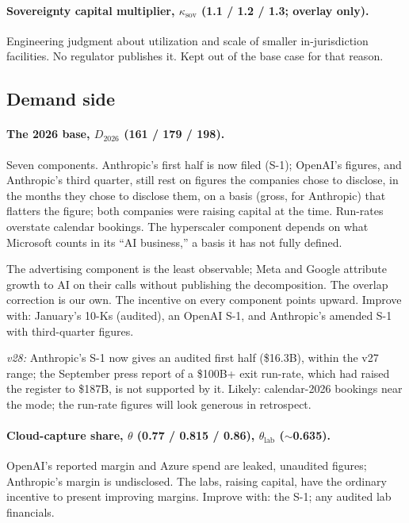 \documentclass[11pt,letterpaper]{article}
\begin{document}
\paragraph{Sovereignty capital multiplier, $\kappa_{\text{sov}}$ (1.1 / 1.2 / 1.3; overlay only).} Engineering judgment about utilization and scale of smaller in-jurisdiction facilities. No regulator publishes it. Kept out of the base case for that reason.

\subsection*{Demand side}

\paragraph{The 2026 base, $D_{2026}$ (161 / 179 / 198).} Seven components. Anthropic's first half is now filed (S-1); OpenAI's figures, and Anthropic's third quarter, still rest on figures the companies chose to disclose, in the months they chose to disclose them, on a basis (gross, for Anthropic) that flatters the figure; both companies were raising capital at the time. Run-rates overstate calendar bookings. The hyperscaler component depends on what Microsoft counts in its ``AI business,'' a basis it has not fully defined.

The advertising component is the least observable; Meta and Google attribute growth to AI on their calls without publishing the decomposition. The overlap correction is our own. The incentive on every component points upward. Improve with: January's 10-Ks (audited), an OpenAI S-1, and Anthropic's amended S-1 with third-quarter figures.

\emph{v28:} Anthropic's S-1 now gives an audited first half (\$16.3B), within the v27 range; the September press report of a \$100B+ exit run-rate, which had raised the register to \$187B, is not supported by it. Likely: calendar-2026 bookings near the mode; the run-rate figures will look generous in retrospect.

\paragraph{Cloud-capture share, $\theta$ (0.77 / 0.815 / 0.86), $\theta_{\text{lab}}$ ($\sim$0.635).} OpenAI's reported margin and Azure spend are leaked, unaudited figures; Anthropic's margin is undisclosed. The labs, raising capital, have the ordinary incentive to present improving margins. Improve with: the S-1; any audited lab financials.
\end{document}
